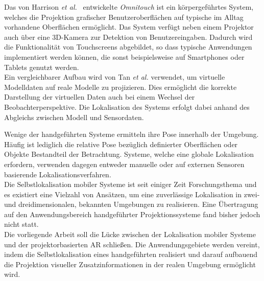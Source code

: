 Das von Harrison \textit{et al.\ }\cite{Harrison2011} entwickelte \textit{Omnitouch} ist ein körpergeführtes System, welches die Projektion grafischer Benutzeroberflächen auf typische im Alltag vorhandene Oberflächen ermöglicht. Das System verfügt neben einem Projektor auch über eine 3D-Kamera zur Detektion von Benutzereingaben. Dadurch wird die Funktionalität von Touchscreens abgebildet, so dass typische Anwendungen implementiert werden können, die sonst beispielsweise auf Smartphones oder Tablets genutzt werden.\\
Ein vergleichbarer Aufbau wird von Tan \textit{et al.} \cite{Tan2013} verwendet, um virtuelle Modelldaten auf reale Modelle zu projizieren. Dies ermöglicht die korrekte Darstellung der virtuellen Daten auch bei einem Wechsel der Beobachterperspektive. Die Lokalisation des Systems erfolgt dabei anhand des Abgleichs zwischen Modell und Sensordaten.\\


Wenige der handgeführten Systeme ermitteln ihre Pose innerhalb der Umgebung. Häufig ist lediglich die relative Pose bezüglich definierter Oberflächen oder Objekte Bestandteil der Betrachtung. Systeme, welche eine globale Lokalisation erfordern, verwenden dagegen entweder manuelle oder auf externen Sensoren basierende Lokalisationsverfahren.\\
Die Selbstlokalisation mobiler Systeme ist seit einiger Zeit Forschungsthema und es existiert eine Vielzahl von Ansätzen, um eine zuverlässige Lokalisation in zwei- und dreidimensionalen, bekannten Umgebungen zu realisieren. Eine Übertragung auf den Anwendungsbereich handgeführter Projektionssysteme fand bisher jedoch nicht statt.\\

Die vorliegende Arbeit soll die Lücke zwischen der Lokalisation mobiler Systeme und der projektorbasierten AR schließen. Die Anwendungsgebiete werden vereint, indem die Selbstlokalisation eines handgeführten  realisiert und darauf aufbauend die Projektion visueller Zusatzinformationen in der realen Umgebung ermöglicht wird.\\



